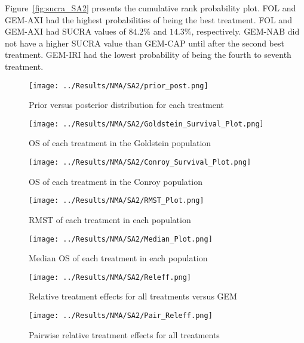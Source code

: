 Figure~\ref{fig:sucra_SA2} presents the cumulative rank probability plot. FOL and GEM-AXI had the highest probabilities of being the best treatment. FOL and GEM-AXI had SUCRA values of $84.2\%$ and $14.3\%$, respectively. GEM-NAB did not have a higher SUCRA value than GEM-CAP until after the second best treatment. GEM-IRI had the lowest probability of being the fourth to seventh treatment. 

\begin{figure}[h]
    \centering
    \texttt{[image: ../Results/NMA/SA2/prior\_post.png]}
    \caption{Prior versus posterior distribution for each treatment}
    \label{fig:prior_post_SA2}
\end{figure}

\begin{figure}[h]
    \centering
    \texttt{[image: ../Results/NMA/SA2/Goldstein\_Survival\_Plot.png]}
    \caption{OS of each treatment in the Goldstein population}
    \label{fig:pred_surv_goldstein_SA2}
\end{figure}

\begin{figure}[h]
    \centering
    \texttt{[image: ../Results/NMA/SA2/Conroy\_Survival\_Plot.png]}
    \caption{OS of each treatment in the Conroy population}
    \label{fig:pred_surv_conroy_SA2}
\end{figure}

\begin{figure}[h]
    \centering
    \texttt{[image: ../Results/NMA/SA2/RMST\_Plot.png]}
    \caption{RMST of each treatment in each population}
    \label{fig:pred_rmst_SA2}
\end{figure}

\begin{figure}[h]
    \centering
    \texttt{[image: ../Results/NMA/SA2/Median\_Plot.png]}
    \caption{Median OS of each treatment in each population}
    \label{fig:pred_median_SA2}
\end{figure}

\begin{figure}[h]
    \centering
    \texttt{[image: ../Results/NMA/SA2/Releff.png]}
    \caption{Relative treatment effects for all treatments versus GEM}
    \label{fig:releff_SA2}
\end{figure}

\begin{figure}[h]
    \centering
    \texttt{[image: ../Results/NMA/SA2/Pair\_Releff.png]}
    \caption{Pairwise relative treatment effects for all treatments}
    \label{fig:pair_releff_SA2}
\end{figure}

